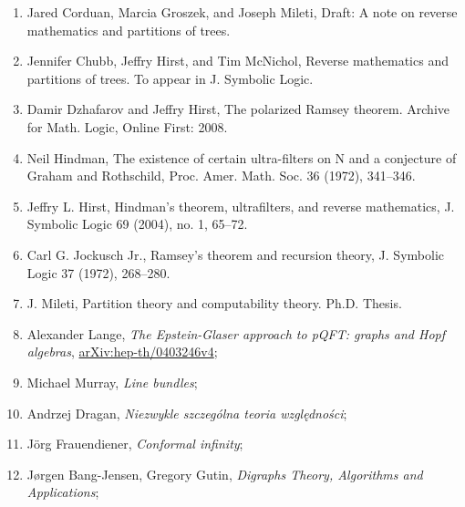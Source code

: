 \documentclass[a4paper,11pt]{article}
\begin{document}
\begin{enumerate}
\item Jared Corduan, Marcia Groszek, and Joseph Mileti, Draft: A note
  on reverse mathematics and partitions of trees.

\item Jennifer Chubb, Jeffry Hirst, and Tim McNichol, Reverse
  mathematics and partitions of trees. To appear in J. Symbolic Logic.

\item Damir Dzhafarov and Jeffry Hirst, The polarized Ramsey theorem.
  Archive for Math. Logic, Online First: 2008.

\item Neil Hindman, The existence of certain ultra-filters on N and a
  conjecture of Graham and Rothschild, Proc. Amer. Math. Soc. 36
  (1972), 341–346.

\item Jeffry L. Hirst, Hindman’s theorem, ultrafilters, and reverse
  mathematics, J. Symbolic Logic 69 (2004), no. 1, 65–72.

\item Carl G. Jockusch Jr., Ramsey’s theorem and recursion theory, J.
  Symbolic Logic 37 (1972), 268–280.

\item J. Mileti, Partition theory and computability theory. Ph.D.
  Thesis.

\item Alexander Lange, \emph{The Epstein-Glaser approach to pQFT:
    graphs and Hopf algebras},
  \href{https://arxiv.org/abs/hep-th/0403246v4}{arXiv:hep-th/0403246v4};

\item Michael Murray, \emph{Line bundles};

\item Andrzej Dragan, \emph{Niezwykle szczególna teoria względności};

\item J\"{o}rg Frauendiener, \emph{Conformal infinity};

\item J\o rgen Bang-Jensen, Gregory Gutin, \emph{Digraphs Theory,
    Algorithms and Applications};


\end{enumerate}
\end{document}
